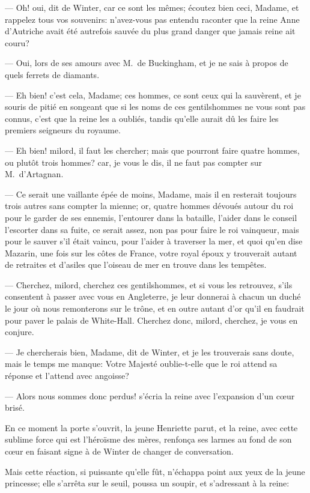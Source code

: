 — Oh! oui, dit de Winter, car ce sont les mêmes; écoutez bien ceci, Madame, et rappelez tous vos souvenirs: n'avez-vous pas entendu raconter que la reine Anne d'Autriche avait été autrefois sauvée du plus grand danger que jamais reine ait couru?

— Oui, lors de ses amours avec M.~de Buckingham, et je ne sais à propos de quels ferrets de diamants.

— Eh bien! c'est cela, Madame; ces hommes, ce sont ceux qui la sauvèrent, et je souris de pitié en songeant que si les noms de ces gentilshommes ne vous sont pas connus, c'est que la reine les a oubliés, tandis qu'elle aurait dû les faire les premiers seigneurs du royaume.

— Eh bien! milord, il faut les chercher; mais que pourront faire quatre hommes, ou plutôt trois hommes? car, je vous le dis, il ne faut pas compter sur M.~d'Artagnan.

— Ce serait une vaillante épée de moins, Madame, mais il en resterait toujours trois autres sans compter la mienne; or, quatre hommes dévoués autour du roi pour le garder de ses ennemis, l'entourer dans la bataille, l'aider dans le conseil l'escorter dans sa fuite, ce serait assez, non pas pour faire le roi vainqueur, mais pour le sauver s'il était vaincu, pour l'aider à traverser la mer, et quoi qu'en dise Mazarin, une fois sur les côtes de France, votre royal époux y trouverait autant de retraites et d'asiles que l'oiseau de mer en trouve dans les tempêtes.

— Cherchez, milord, cherchez ces gentilshommes, et si vous les retrouvez, s'ils consentent à passer avec vous en Angleterre, je leur donnerai à chacun un duché le jour où nous remonterons sur le trône, et en outre autant d'or qu'il en faudrait pour paver le palais de White-Hall. Cherchez donc, milord, cherchez, je vous en conjure.

— Je chercherais bien, Madame, dit de Winter, et je les trouverais sans doute, mais le temps me manque: Votre Majesté oublie-t-elle que le roi attend sa réponse et l'attend avec angoisse?

— Alors nous sommes donc perdus! s'écria la reine avec l'expansion d'un cœur brisé.

En ce moment la porte s'ouvrit, la jeune Henriette parut, et la reine, avec cette sublime force qui est l'héroïsme des mères, renfonça ses larmes au fond de son cœur en faisant signe à de Winter de changer de conversation.

Mais cette réaction, si puissante qu'elle fût, n'échappa point aux yeux de la jeune princesse; elle s'arrêta sur le seuil, poussa un soupir, et s'adressant à la reine:

